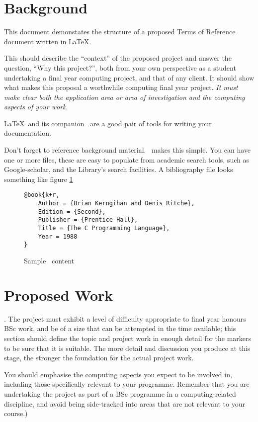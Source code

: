 \section{Background}
This document demonstates the structure of a proposed Terms of Reference document written in \LaTeX.

This should describe the ``context'' of the proposed project and answer the question, ``Why this project?'', both from your own perspective as a student undertaking a final year computing project, and that of any client.  It should show what makes this proposal a worthwhile computing final year project.  \emph{It must make clear both the application area or area of investigation and the computing aspects of your work}.

\LaTeX\ and its companion \BibTeX\ are a good pair of tools for writing your documentation.

Don't forget to reference background material.  \BibTeX\ makes this simple.
You can have one or more  files, these are  easy to populate from academic search tools, such as Google-scholar, and the Library's search facilities.  A bibliography file looks something like figure \ref{bibtex-sample}

\begin{figure}
\begin{tcolorbox}{}
\begin{verbatim}
@book{k+r,
	Author = {Brian Kerngihan and Denis Ritche},
	Edition = {Second},
	Publisher = {Prentice Hall},
	Title = {The C Programming Language},
	Year = 1988
}
\end{verbatim}
\end{tcolorbox}
\caption{Sample \BibTeX\ content}
\label{bibtex-sample}
\end{figure}

\section{Proposed Work}
.  The project must exhibit a level of difficulty appropriate to final year honours BSc work, and be of a size that can be attempted in the time available; this section should define the topic and project work in enough detail for the markers to be sure that it is suitable. The more detail and discussion you produce at this stage, the stronger the foundation for the actual project work.

You should emphasise the computing aspects you expect to be involved in, including those specifically relevant to your programme.  Remember that you are undertaking the project as part of a BSc programme in a computing-related discipline, and avoid being side-tracked into areas that are not relevant to your course.) 

